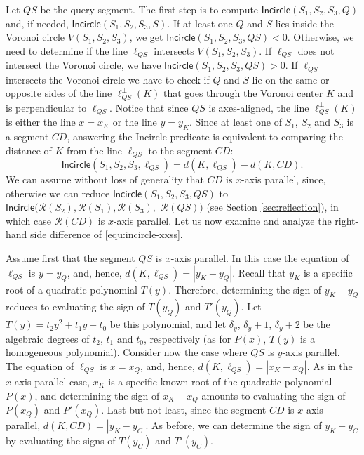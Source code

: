 \documentclass[letterpaper,11pt]{article}
\newcommand{\incircle}{\textsf{Incircle}\xspace}
\newcommand{\vor}{Voronoi\xspace}
\newcommand{\rfx}[1]{\mathcal{R}(#1)\xspace}
\begin{document}
Let $QS$ be the query segment. The first step is to compute
$\incircle(S_1,S_2,S_3,Q)$ and, if needed,
$\incircle(S_1,S_2,S_3,S)$. If at least one $Q$ and $S$ lies inside
the \vor circle $V(S_1,S_2,S_3)$, we get
$\incircle(S_1,S_2,S_3,QS)<0$. Otherwise, we need to determine if the
line $\ell_{QS}$ intersects $V(S_1,S_2,S_3)$. If $\ell_{QS}$ does not
intersect the \vor circle, we have $\incircle(S_1,S_2,S_3,QS)>0$. If
$\ell_{QS}$ intersects the \vor circle we have to check if $Q$ and $S$
lie on the same or opposite sides of the line $\ell^\perp_{QS}(K)$ that
goes through the \vor center $K$ and is perpendicular to
$\ell_{QS}$. Notice that since $QS$ is axes-aligned, the line
$\ell^\perp_{QS}(K)$ is either the line $x=x_K$ or the line $y=y_K$.
Since at least one of $S_1$, $S_2$ and $S_3$ is a segment $CD$,
answering the \incircle predicate is equivalent to comparing the
distance of $K$ from the line $\ell_{QS}$ to the segment $CD$: \begin{equation}\label{equ:incircle-xxss}
  \incircle(S_1,S_2,S_3,\ell_{QS}) = d(K,\ell_{QS})-d(K,CD).
\end{equation}
We can assume without loss of generality that $CD$ is
$x$-axis parallel, since, otherwise we can reduce
$\incircle(S_1,S_2,S_3,QS)$ to
$\incircle(\rfx{S_2},\rfx{S_1},\rfx{S_3},$ $\rfx{QS})$ (see Section
\ref{sec:reflection}), in which case $\rfx{CD}$ is $x$-axis parallel.
Let us now examine and analyze the right-hand side difference of
\eqref{equ:incircle-xxss}.

Assume first that the segment $QS$ is $x$-axis parallel. In this case the
equation of $\ell_{QS}$ is $y=y_Q$, and, hence,
$d(K,\ell_{QS})=|y_K-y_Q|$. Recall that $y_K$ is a specific root of a
quadratic polynomial $T(y)$. Therefore, determining the sign of
$y_K-y_Q$ reduces to evaluating the sign of $T(y_Q)$ and $T'(y_Q)$.
Let $T(y)=t_2y^2+t_1y+t_0$ be this polynomial, and let $\delta_y$,
$\delta_y+1$, $\delta_y+2$ be the algebraic degrees of $t_2$, $t_1$ and
$t_0$, respectively (as for $P(x)$, $T(y)$ is a homogeneous polynomial).
Consider now the case where $QS$ is $y$-axis parallel. The equation of
$\ell_{QS}$ is $x=x_Q$, and, hence, $d(K,\ell_{QS})=|x_K-x_Q|$. As in
the $x$-axis parallel case, $x_K$ is a specific known root of the 
quadratic polynomial $P(x)$, and determining the sign of $x_K-x_Q$
amounts to evaluating the sign of $P(x_Q)$ and $P'(x_Q)$. 
Last but not least, since the segment $CD$ is $x$-axis parallel,
$d(K,CD)=|y_K-y_C|$. As before, we can determine the sign of $y_K-y_C$
by evaluating the signs of $T(y_C)$ and $T'(y_C)$.
\end{document}
